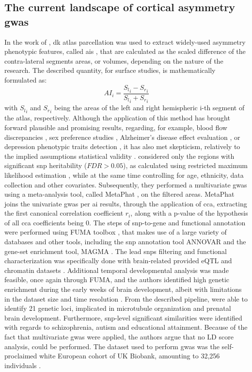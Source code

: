 \subsection{The current landscape of cortical asymmetry \ac{gwas}} 
 In the work of \citet{Sha2021}, \ac{dk} atlas parcellation was used to extract widely-used asymmetry phenotypic features, called \acfp{ai} \cite{Graham2022,Sarica2018,Kong2018,Savic2008,Zuo2019}, that are calculated as the scaled difference of the contra-lateral segments areas, or volumes, depending on the nature of the research. The described quantity, for surface studies, is mathematically formulated as:
$$
AI_i = \frac{{S_l}_i-{S_r}_i}{{S_l}_i+{S_r}_i}
$$
with ${S_l}_i$ and ${S_r}_i$ being the areas of the left and right hemispheric i-th segment of the atlas, respectively. Although the application of this method has brought forward plausible and promising results, regarding, for example, blood flow discrepancies \cite{Graham2022}, sex preference studies \cite{Savic2008}, Alzheimer's disease effect evaluation \cite{Sarica2018},  or depression phenotypic traits detection \cite{Zuo2019}, it has also met skepticism, relatively to the implied assumptions statistical validity \cite{Coles2008}. \citet{Sha2021} considered only the regions with significant \ac{snp} heritability ($FDR>0.05$), as calculated using restricted maximum likelihood estimation \cite{Yang2010}, while at the same time controlling for age, ethnicity, data collection and other covariates. Subsequently, they performed a multivariate \ac{gwas}  using a meta-analysis tool, called MetaPhat \cite{Lin2020}, on the filtered areas. MetaPhat joins the univariate \ac{gwas} per \ac{ai} results, through the application of \ac{cca}, extracting the first canonical correlation coefficient $r_i$, along with a p-value of the hypothesis of all \ac{cca} coefficients being 0. The steps of snp-to-gene and functional annotation were performed using FUMA toolbox \cite{Watanabe2017}, that makes use of a large variety of databases and other tools, including the \ac{snp} annotation tool ANNOVAR \cite{Wang2010} and  the gene-set enrichment tool, MAGMA \cite{DeLeeuw2015}. The lead \acp{snp} filtering and functional characterization was specifically done with brain-related provided eQTL and chromatin datasets \cite{Sha2021}. Additional temporal developmental analysis was made feasible, once again through FUMA, and the authors identified high genetic enrichment during the early weeks of brain development, albeit with limitations in the dataset size and time resolution \cite{Kang2011}.  From the described pipeline, \citet{Sha2021} were able to identify 21 genetic loci, implicated in microtubule organization and prenatal brain development. Furthermore, \ac{snp}-level significant similarities were identified with regards to schizophrenia, autism and educational attainment\cite{Sha2021}. Because of the fact that multivariate \ac{gwas} were applied, the authors argue that no LD score analysis, could be performed. The dataset used to perform \ac{gwas} was the self-proclaimed white European cohort of UK Biobank, amounting to 32,256 individuals \cite{Littlejohns2020}.

